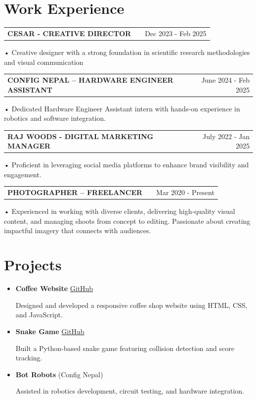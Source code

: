 \documentclass[a4paper,12pt]{article}
\makeatletter
\newenvironment{jobshort}[2]
    {
    \begin{tabularx}{\linewidth}{@{}l X r@{}}
    \textbf{#1} & \hfill &  #2 \\[3.75pt]
    \end{tabularx}
    }
    {
    }
\makeatother
\begin{document}
\section{Work Experience}

\begin{jobshort}{CESAR - CREATIVE DIRECTOR} { Dec 2023 - Feb 2025}
• Creative designer with a strong foundation in scientific research methodologies and visual communication
\end{jobshort}

\begin{jobshort}{CONFIG NEPAL – HARDWARE ENGINEER ASSISTANT } {June 2024 - Feb 2025}
• Dedicated Hardware Engineer Assistant intern with hands-on experience in robotics and software integration.
\end{jobshort}

\begin{jobshort}{RAJ WOODS - DIGITAL MARKETING MANAGER }{July 2022 - Jan 2025}
• Proficient in leveraging social media platforms to enhance brand visibility and engagement.
\end{jobshort}

\begin{jobshort}{PHOTOGRAPHER – FREELANCER} {Mar 2020 - Present}
• Experienced in working with diverse clients, delivering high-quality visual content, and managing shoots from concept to editing. Passionate about creating impactful imagery that connects with audiences.
\end{jobshort}

\section{Projects}

\begin{itemize}
    \item \textbf{Coffee Website} \hfill \href{https://github.com/yourusername/coffee-website}{GitHub}
    
    Designed and developed a responsive coffee shop website using HTML, CSS, and JavaScript.

    \item \textbf{Snake Game} \hfill \href{https://github.com/yourusername/snake-game}{GitHub}
    
    Built a Python-based snake game featuring collision detection and score tracking.

    \item \textbf{Bot Robots} (Config Nepal)
    
    Assisted in robotics development, circuit testing, and hardware integration.
\end{itemize}
\end{document}
